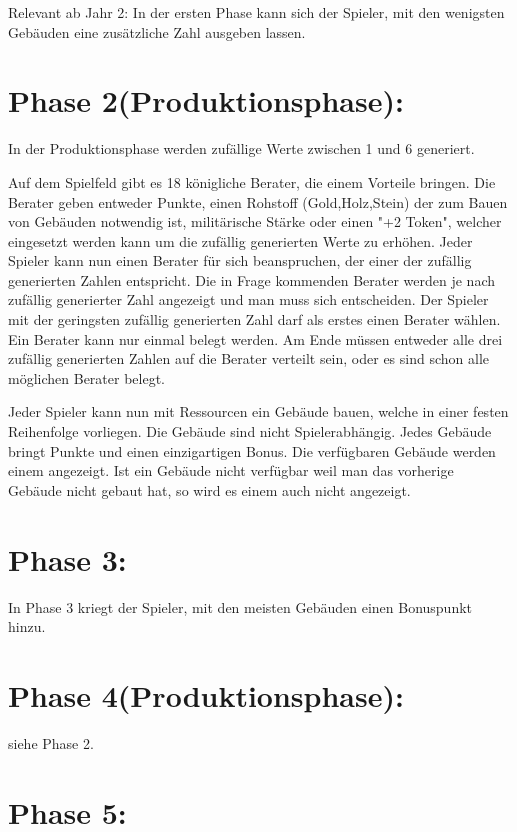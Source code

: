 \documentclass[a4paper]{scrreprt}
\begin{document}
Relevant ab Jahr 2:
In der ersten Phase kann sich der Spieler, mit den wenigsten Gebäuden eine zusätzliche Zahl ausgeben lassen.

\section{Phase 2(Produktionsphase):}

In der Produktionsphase werden zufällige Werte zwischen 1 und 6 generiert.

Auf dem Spielfeld gibt es 18 königliche Berater, die einem Vorteile bringen. Die Berater geben entweder Punkte, einen Rohstoff (Gold,Holz,Stein) der zum Bauen von Gebäuden notwendig ist, militärische Stärke oder einen "+2 Token", welcher eingesetzt werden kann um die zufällig generierten Werte zu erhöhen. Jeder Spieler kann nun einen Berater für sich beanspruchen, der einer der zufällig generierten Zahlen entspricht. Die in Frage kommenden Berater werden je nach zufällig generierter Zahl angezeigt und man muss sich entscheiden. Der Spieler mit der geringsten zufällig generierten Zahl darf als erstes einen Berater wählen. Ein Berater kann nur einmal belegt werden. Am Ende müssen entweder alle drei zufällig generierten Zahlen auf die Berater verteilt sein, oder es sind schon alle möglichen Berater belegt.

Jeder Spieler kann nun mit Ressourcen ein Gebäude bauen, welche in einer festen Reihenfolge vorliegen. Die Gebäude sind nicht Spielerabhängig. Jedes Gebäude bringt Punkte und einen einzigartigen Bonus. Die verfügbaren Gebäude werden einem angezeigt. Ist ein Gebäude nicht verfügbar weil man das vorherige Gebäude nicht gebaut hat, so wird es einem auch nicht angezeigt.


\section{Phase 3:}

In Phase 3 kriegt der Spieler, mit den meisten Gebäuden einen Bonuspunkt hinzu.


\section{Phase 4(Produktionsphase):}

siehe Phase 2.

\section{Phase 5:}
\end{document}

